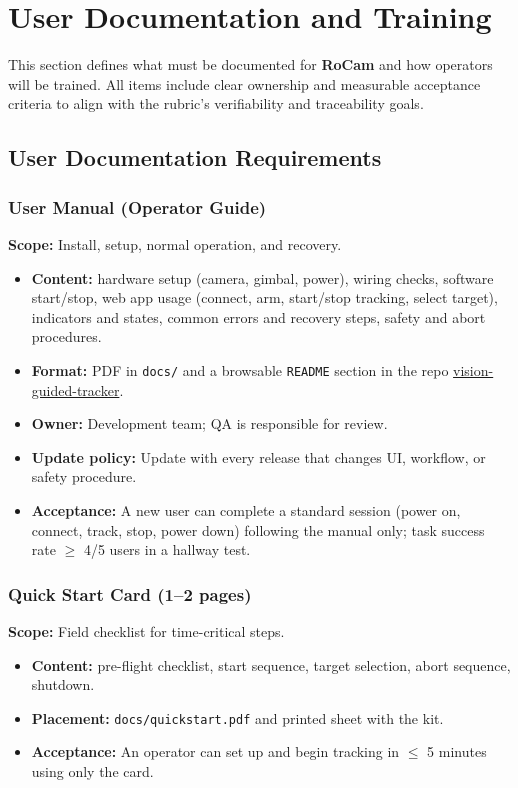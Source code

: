 \documentclass[12pt]{article}
\begin{document}

\section{User Documentation and Training}
\label{sec:user-docs-training}

This section defines what must be documented for \textbf{RoCam} and how operators will be trained. All items include clear ownership and measurable acceptance criteria to align with the rubric’s verifiability and traceability goals.

\subsection{User Documentation Requirements}
\label{subsec:user-docs-reqs}

\subsubsection{User Manual (Operator Guide)}
\textbf{Scope:} Install, setup, normal operation, and recovery.
\begin{itemize}
  \item \textbf{Content:} hardware setup (camera, gimbal, power), wiring checks, software start/stop, web app usage (connect, arm, start/stop tracking, select target), indicators and states, common errors and recovery steps, safety and abort procedures.
  \item \textbf{Format:} PDF in \texttt{docs/} and a browsable \texttt{README} section in the repo \href{https://github.com/ZifanSi/vision-guided-tracker}{vision-guided-tracker}.
  \item \textbf{Owner:} Development team; QA is responsible for review.
  \item \textbf{Update policy:} Update with every release that changes UI, workflow, or safety procedure.
  \item \textbf{Acceptance:} A new user can complete a standard session (power on, connect, track, stop, power down) following the manual only; task success rate $\geq$ 4/5 users in a hallway test.
\end{itemize}

\subsubsection{Quick Start Card (1–2 pages)}
\textbf{Scope:} Field checklist for time-critical steps.
\begin{itemize}
  \item \textbf{Content:} pre-flight checklist, start sequence, target selection, abort sequence, shutdown.
  \item \textbf{Placement:} \texttt{docs/quickstart.pdf} and printed sheet with the kit.
  \item \textbf{Acceptance:} An operator can set up and begin tracking in $\leq$ 5 minutes using only the card.
\end{itemize}
\end{document}
